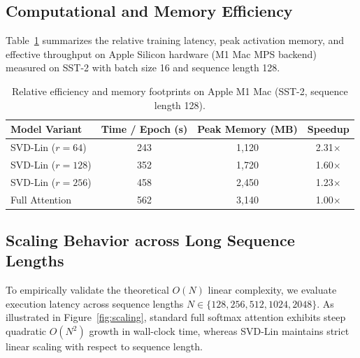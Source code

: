 \subsection{Computational and Memory Efficiency}
Table~\ref{tab:efficiency} summarizes the relative training latency, peak activation memory, and effective throughput on Apple Silicon hardware (M1 Mac MPS backend) measured on SST-2 with batch size 16 and sequence length 128.

\begin{table}[h]
\centering
\caption{Relative efficiency and memory footprints on Apple M1 Mac (SST-2, sequence length 128).}
\label{tab:efficiency}
\begin{tabular}{lccc}
\toprule
\textbf{Model Variant} & \textbf{Time / Epoch (s)} & \textbf{Peak Memory (MB)} & \textbf{Speedup} \\
\midrule
SVD-Lin ($r=64$)  & 243 & 1,120 & 2.31$\times$ \\
SVD-Lin ($r=128$) & 352 & 1,720 & 1.60$\times$ \\
SVD-Lin ($r=256$) & 458 & 2,450 & 1.23$\times$ \\
Full Attention    & 562 & 3,140 & 1.00$\times$ \\
\bottomrule
\end{tabular}
\end{table}

\subsection{Scaling Behavior across Long Sequence Lengths}
To empirically validate the theoretical $O(N)$ linear complexity, we evaluate execution latency across sequence lengths $N \in \{128, 256, 512, 1024, 2048\}$. As illustrated in Figure~\ref{fig:scaling}, standard full softmax attention exhibits steep quadratic $O(N^2)$ growth in wall-clock time, whereas SVD-Lin maintains strict linear scaling with respect to sequence length.

